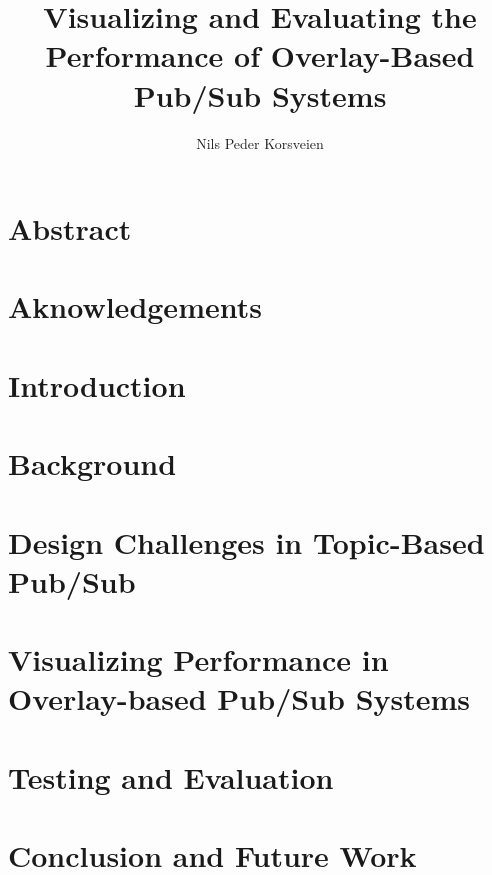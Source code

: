 \documentclass[UKenglish, a4paper]{ifimaster}
\title{Visualizing and Evaluating the Performance of Overlay-Based Pub/Sub Systems}
\subtitle{}
\author{Nils Peder Korsveien}
\begin{document}
\ififorside{}
\frontmatter{}
\maketitle{}

\chapter*{Abstract}
\tableofcontents{}
\listoffigures{}
\listoftables{}
\chapter*{Aknowledgements}
\mainmatter{}

\chapter{Introduction}


\chapter{Background}
\label{ch:background}


\chapter{Design Challenges in Topic-Based Pub/Sub}
\label{ch:design-challenges}


\chapter{Visualizing Performance in Overlay-based Pub/Sub Systems}
\label{ch:vizpub}


\chapter{Testing and Evaluation}
\label{ch:evaluation}


\chapter{Conclusion and Future Work}

\label{ch:conclusion-and-future-work}


\backmatter{}
\printbibliography{}
\end{document}
